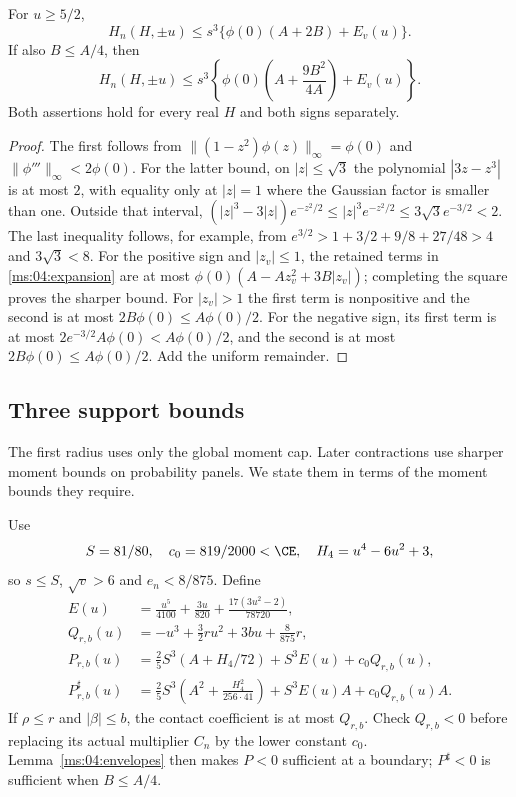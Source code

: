 \begin{lemma}\label{ms:04:envelopes}
For $u\ge5/2$,
\[
 H_n(H,\pm u)\le s^3\{\phi(0)(A+2B)+E_v(u)\}.
\]
If also $B\le A/4$, then
\[
 H_n(H,\pm u)\le
 s^3\left\{\phi(0)\left(A+\frac{9B^2}{4A}\right)+E_v(u)\right\}.
\]
Both assertions hold for every real $H$ and both signs separately.
\end{lemma}
\begin{proof}
The first follows from
$\|(1-z^2)\phi(z)\|_\infty=\phi(0)$ and
$\|\phi'''\|_\infty<2\phi(0)$.
For the latter bound, on $|z|\le\sqrt3$ the polynomial
$|3z-z^3|$ is at most $2$, with equality only at $|z|=1$ where the
Gaussian factor is smaller than one. Outside that interval,
$(|z|^3-3|z|)e^{-z^2/2}\le |z|^3e^{-z^2/2}
\le3\sqrt3e^{-3/2}<2$. The last inequality follows, for example,
from $e^{3/2}>1+3/2+9/8+27/48>4$ and $3\sqrt3<8$.
For the positive sign and $|z_v|\le1$, the retained terms in
\eqref{ms:04:expansion} are at most
$\phi(0)(A-Az_v^2+3B|z_v|)$; completing the square proves the sharper bound.
For $|z_v|>1$ the first term is nonpositive and the second is at most
$2B\phi(0)\le A\phi(0)/2$.
For the negative sign, its first term is at most
$2e^{-3/2}A\phi(0)<A\phi(0)/2$, and the second is at most
$2B\phi(0)\le A\phi(0)/2$. Add the uniform remainder.
\end{proof}

\subsection{Three support bounds}
The first radius uses only the global moment cap. Later contractions use
sharper moment bounds on probability panels. We state them in terms of the moment bounds they require.

Use
\[
 S=81/80,\quad  c_0=819/2000<\CE,\quad
 H_4=u^4-6u^2+3,
\]
so $s\le S$, $\sqrt v>6$ and $e_n<8/875$. Define
\begin{align*}
 E(u)&=\frac{u^5}{4100}+\frac{3u}{820}
                   +\frac{17(3u^2-2)}{78720},\\
 Q_{r,b}(u)&=-u^3+\tfrac32ru^2+3bu+\tfrac8{875}r,\\
 P_{r,b}(u)&=\tfrac25S^3(A+H_4/72)+S^3E(u)+c_0Q_{r,b}(u),\\
 P^\sharp_{r,b}(u)&=\tfrac25S^3
       \left(A^2+\frac{H_4^2}{256\cdot41}\right)
       +S^3E(u)A+c_0Q_{r,b}(u)A.
\end{align*}
If $\rho\le r$ and $|\beta|\le b$, the contact coefficient is at
most $Q_{r,b}$. Check $Q_{r,b}<0$ before replacing its actual multiplier
$C_n$ by the lower constant $c_0$. Lemma~\ref{ms:04:envelopes} then makes
$P<0$ sufficient at a boundary; $P^\sharp<0$ is sufficient when $B\le A/4$.

